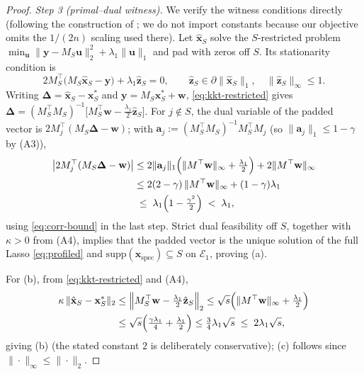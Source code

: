 \documentclass[10pt]{article} %
\theoremstyle{plain}
\theoremstyle{definition}
\begin{document}
\begin{proof}
\emph{Step 3 (primal--dual witness).} We verify the witness
conditions directly (following the construction of
\citealp[\S 7.5]{Wainwright2019}; we do not import constants because
our objective omits the $1/(2n)$ scaling used there). Let
$\hat{\mathbf{x}}_{S}$ solve the $S$-restricted problem
$\min_{\mathbf{u}}\|\mathbf{y}-M_{S}\mathbf{u}\|_{2}^{2}
+\lambda_{1}\|\mathbf{u}\|_{1}$ and pad with zeros off $S$. Its
stationarity condition is
\begin{equation}
2M_{S}^{\top}\bigl(M_{S}\hat{\mathbf{x}}_{S}-\mathbf{y}\bigr)
+ \lambda_{1}\hat{\mathbf{z}}_{S} = 0,
\qquad \hat{\mathbf{z}}_{S}\in\partial\|\hat{\mathbf{x}}_{S}\|_{1},
\quad \|\hat{\mathbf{z}}_{S}\|_{\infty}\le 1.
\label{eq:kkt-restricted}
\end{equation}
Writing $\boldsymbol{\Delta}=\hat{\mathbf{x}}_{S}-\mathbf{x}^{*}_{S}$
and $\mathbf{y}=M_{S}\mathbf{x}^{*}_{S}+\mathbf{w}$,
\eqref{eq:kkt-restricted} gives
$\boldsymbol{\Delta} = (M_{S}^{\top}M_{S})^{-1}
\bigl[M_{S}^{\top}\mathbf{w}-\tfrac{\lambda_{1}}{2}
\hat{\mathbf{z}}_{S}\bigr]$. For $j\notin S$, the dual variable of
the padded vector is $2M_{j}^{\top}(M_{S}\boldsymbol{\Delta}
-\mathbf{w})$; with $\mathbf{a}_{j}
:=(M_{S}^{\top}M_{S})^{-1}M_{S}^{\top}M_{j}$ (so
$\|\mathbf{a}_{j}\|_{1}\le 1-\gamma$ by (A3)),
\begin{align}
\bigl|2M_{j}^{\top}(M_{S}\boldsymbol{\Delta}-\mathbf{w})\bigr|
&\le 2\|\mathbf{a}_{j}\|_{1}
\Bigl(\|M^{\top}\mathbf{w}\|_{\infty}+\tfrac{\lambda_{1}}{2}\Bigr)
+ 2\|M^{\top}\mathbf{w}\|_{\infty} \nonumber\\
&\le 2(2-\gamma)\,\|M^{\top}\mathbf{w}\|_{\infty}
+ (1-\gamma)\lambda_{1} \\
&\;\le\; \lambda_{1}\Bigl(1-\tfrac{\gamma^{2}}{2}\Bigr)
\;<\; \lambda_{1},
\end{align}
using \eqref{eq:corr-bound} in the last step. Strict dual
feasibility off $S$, together with $\kappa>0$ from (A4), implies
that the padded vector is the unique solution of the full Lasso
\eqref{eq:profiled} and
$\mathrm{supp}(\hat{\mathbf{x}}_{\mathrm{spec}})\subseteq S$ on
$\mathcal{E}_{1}$, proving (a).

For (b), from \eqref{eq:kkt-restricted} and (A4),
\begin{align}
\kappa\,\|\hat{\mathbf{x}}_{S}-\mathbf{x}^{*}_{S}\|_{2}
&\le \Bigl\|M_{S}^{\top}\mathbf{w}
-\tfrac{\lambda_{1}}{2}\hat{\mathbf{z}}_{S}\Bigr\|_{2}
\le \sqrt{s}\Bigl(\|M^{\top}\mathbf{w}\|_{\infty}
+ \tfrac{\lambda_{1}}{2}\Bigr) \nonumber\\
&\le \sqrt{s}\Bigl(\tfrac{\gamma\lambda_{1}}{4}
+\tfrac{\lambda_{1}}{2}\Bigr)
\le \tfrac{3}{4}\lambda_{1}\sqrt{s}
\;\le\; 2\lambda_{1}\sqrt{s},
\end{align}
giving (b) (the stated constant $2$ is deliberately conservative);
(c) follows since $\|\cdot\|_{\infty}\le\|\cdot\|_{2}$.


\end{proof}
\end{document}

